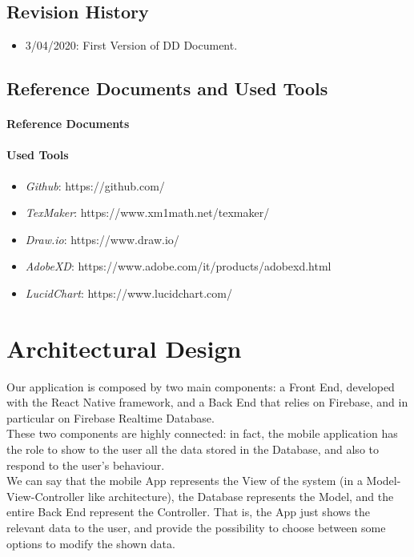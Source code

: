 \documentclass[11pt]{article} %
\begin{document}
\subsection{Revision History}
\begin{itemize}
\item 3/04/2020: First Version of DD Document.
\end{itemize}

\subsection{Reference Documents and Used Tools}
\paragraph{Reference Documents}


\paragraph{Used Tools}
\begin{itemize}
\item \textit{Github}: https://github.com/
\item \textit{TexMaker}: https://www.xm1math.net/texmaker/
\item \textit{Draw.io}: https://www.draw.io/
\item \textit{AdobeXD}: https://www.adobe.com/it/products/adobexd.html
\item \textit{LucidChart}: https://www.lucidchart.com/
\end{itemize}


\section{Architectural Design}
Our application is composed by two main components: a Front End, developed with the React Native framework, and a Back End that relies on Firebase, and in particular on Firebase Realtime Database.\\
These two components are highly connected: in fact, the mobile application has the role to show to the user all the data stored in the Database, and also to respond to the user's behaviour.\\
We can say that the mobile App represents the View of the system (in a Model-View-Controller like architecture), the Database represents the Model, and the entire Back End represent the Controller. That is, the App just shows the relevant data to the user, and provide the possibility to choose between some options to modify the shown data.
\end{document}

